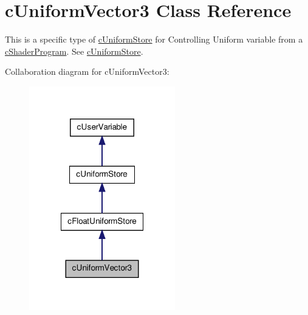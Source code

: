 \hypertarget{classc_uniform_vector3}{
\section{cUniformVector3 Class Reference}
\label{classc_uniform_vector3}
}


This is a specific type of \hyperlink{classc_uniform_store}{cUniformStore} for Controlling Uniform variable from a \hyperlink{classc_shader_program}{cShaderProgram}. See \hyperlink{classc_uniform_store}{cUniformStore}.  




Collaboration diagram for cUniformVector3:\nopagebreak
\begin{figure}[H]
\begin{center}
\leavevmode
\includegraphics[width=180pt]{classc_uniform_vector3__coll__graph}
\end{center}
\end{figure}
